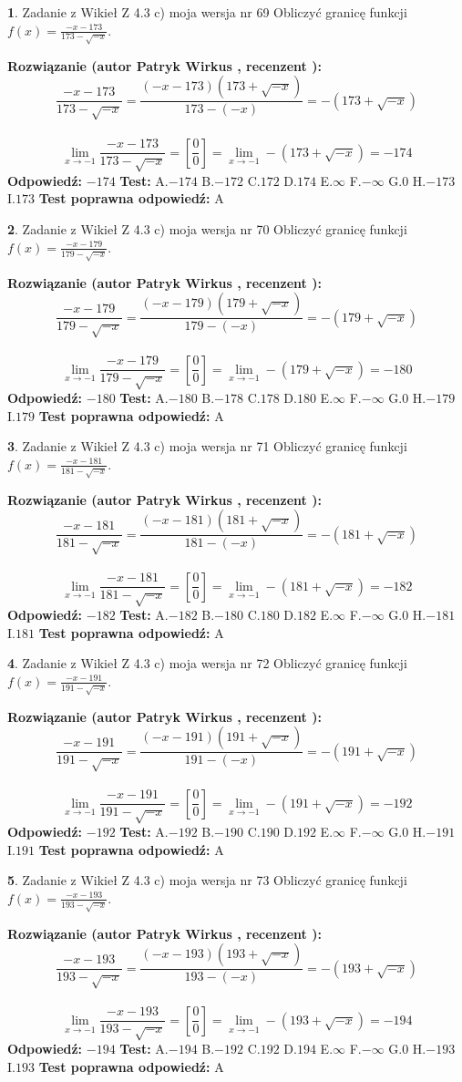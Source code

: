 \documentclass[12pt, a4paper]{article}
\theoremstyle{definition} %
\newtheorem{zad}{}
\newcommand{\zadStart}[1]{\begin{zad}#1\newline}
\newcommand{\zadStop}{\end{zad}}
\newcommand{\rozwStart}[2]{\noindent \textbf{Rozwiązanie (autor #1 , recenzent #2): }\newline}
\newcommand{\rozwStop}{\newline}
\newcommand{\odpStart}{\noindent \textbf{Odpowiedź:}\newline}
\newcommand{\odpStop}{\newline}
\newcommand{\testStart}{\noindent \textbf{Test:}\newline}
\newcommand{\testStop}{\newline}
\newcommand{\kluczStart}{\noindent \textbf{Test poprawna odpowiedź:}\newline}
\newcommand{\kluczStop}{\newline}
\begin{document}
\zadStart{Zadanie z Wikieł Z 4.3 c) moja wersja nr 69}
Obliczyć granicę funkcji $f(x)=\frac{-x-173}{173-\sqrt{-x}}$.
\zadStop
\rozwStart{Patryk Wirkus}{}
$$\frac{-x-173}{173-\sqrt{-x}}=\frac{(-x-173)(173+\sqrt{-x})}{173-(-x)}=-(173+\sqrt{-x})$$
\\
$$\lim\limits_{x\to-1}\frac{-x-173}{173-\sqrt{-x}}=[\frac{0}{0}]=\lim\limits_{x\to-1}-(173+\sqrt{-x}) =-174$$
\rozwStop
\odpStart
$-174$
\odpStop
\testStart
A.$-174$
B.$-172$
C.$172$
D.$174$
E.$\infty$
F.$-\infty$
G.$0$
H.$-173$
I.$173$
\testStop
\kluczStart
A
\kluczStop



\zadStart{Zadanie z Wikieł Z 4.3 c) moja wersja nr 70}
Obliczyć granicę funkcji $f(x)=\frac{-x-179}{179-\sqrt{-x}}$.
\zadStop
\rozwStart{Patryk Wirkus}{}
$$\frac{-x-179}{179-\sqrt{-x}}=\frac{(-x-179)(179+\sqrt{-x})}{179-(-x)}=-(179+\sqrt{-x})$$
\\
$$\lim\limits_{x\to-1}\frac{-x-179}{179-\sqrt{-x}}=[\frac{0}{0}]=\lim\limits_{x\to-1}-(179+\sqrt{-x}) =-180$$
\rozwStop
\odpStart
$-180$
\odpStop
\testStart
A.$-180$
B.$-178$
C.$178$
D.$180$
E.$\infty$
F.$-\infty$
G.$0$
H.$-179$
I.$179$
\testStop
\kluczStart
A
\kluczStop



\zadStart{Zadanie z Wikieł Z 4.3 c) moja wersja nr 71}
Obliczyć granicę funkcji $f(x)=\frac{-x-181}{181-\sqrt{-x}}$.
\zadStop
\rozwStart{Patryk Wirkus}{}
$$\frac{-x-181}{181-\sqrt{-x}}=\frac{(-x-181)(181+\sqrt{-x})}{181-(-x)}=-(181+\sqrt{-x})$$
\\
$$\lim\limits_{x\to-1}\frac{-x-181}{181-\sqrt{-x}}=[\frac{0}{0}]=\lim\limits_{x\to-1}-(181+\sqrt{-x}) =-182$$
\rozwStop
\odpStart
$-182$
\odpStop
\testStart
A.$-182$
B.$-180$
C.$180$
D.$182$
E.$\infty$
F.$-\infty$
G.$0$
H.$-181$
I.$181$
\testStop
\kluczStart
A
\kluczStop



\zadStart{Zadanie z Wikieł Z 4.3 c) moja wersja nr 72}
Obliczyć granicę funkcji $f(x)=\frac{-x-191}{191-\sqrt{-x}}$.
\zadStop
\rozwStart{Patryk Wirkus}{}
$$\frac{-x-191}{191-\sqrt{-x}}=\frac{(-x-191)(191+\sqrt{-x})}{191-(-x)}=-(191+\sqrt{-x})$$
\\
$$\lim\limits_{x\to-1}\frac{-x-191}{191-\sqrt{-x}}=[\frac{0}{0}]=\lim\limits_{x\to-1}-(191+\sqrt{-x}) =-192$$
\rozwStop
\odpStart
$-192$
\odpStop
\testStart
A.$-192$
B.$-190$
C.$190$
D.$192$
E.$\infty$
F.$-\infty$
G.$0$
H.$-191$
I.$191$
\testStop
\kluczStart
A
\kluczStop



\zadStart{Zadanie z Wikieł Z 4.3 c) moja wersja nr 73}
Obliczyć granicę funkcji $f(x)=\frac{-x-193}{193-\sqrt{-x}}$.
\zadStop
\rozwStart{Patryk Wirkus}{}
$$\frac{-x-193}{193-\sqrt{-x}}=\frac{(-x-193)(193+\sqrt{-x})}{193-(-x)}=-(193+\sqrt{-x})$$
\\
$$\lim\limits_{x\to-1}\frac{-x-193}{193-\sqrt{-x}}=[\frac{0}{0}]=\lim\limits_{x\to-1}-(193+\sqrt{-x}) =-194$$
\rozwStop
\odpStart
$-194$
\odpStop
\testStart
A.$-194$
B.$-192$
C.$192$
D.$194$
E.$\infty$
F.$-\infty$
G.$0$
H.$-193$
I.$193$
\testStop
\kluczStart
A
\kluczStop
\end{document}
